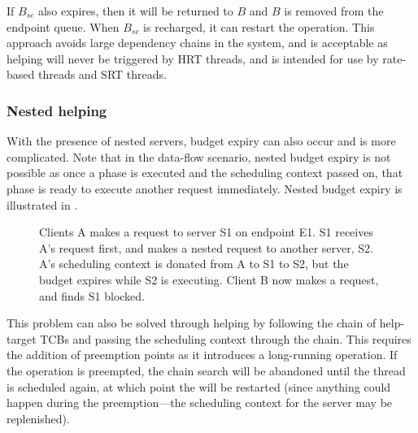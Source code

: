 If $B_{sc}$ also expires, then it will be returned to $B$ and $B$ is removed from the endpoint queue.
When $B_{sc}$ is recharged, it can restart the operation.
This approach avoids large dependency chains in the system, and is acceptable as helping will never be triggered by \gls{HRT} threads, and is intended for use by rate-based threads and \gls{SRT} threads.

\subsubsection{Nested helping}

With the presence of nested servers, budget expiry can also occur and is more complicated.
Note that in the data-flow scenario, nested budget expiry is not possible as once a phase is executed and the scheduling context passed on, that phase is ready to execute another request immediately.
Nested budget expiry is illustrated in .

\begin{figure}
\centering
\caption{Clients A makes a request to server S1 on endpoint E1. S1 receives A's request first, and makes a nested request to another server, S2. A's scheduling context is donated from A to S1 to S2, but the budget expires while S2 is executing. Client B now makes a request, and finds S1 blocked.}
\label{fig:nested-budget-expiry}
\end{figure}

This problem can also be solved through helping by following the chain of help-target TCBs and passing the scheduling context through the chain.
This requires the addition of preemption points as it introduces a long-running operation.
If the operation is preempted, the chain search will be abandoned until the thread is scheduled again, at which point the \call will be restarted (since anything could happen during the preemption---the scheduling context for the server may be replenished).

